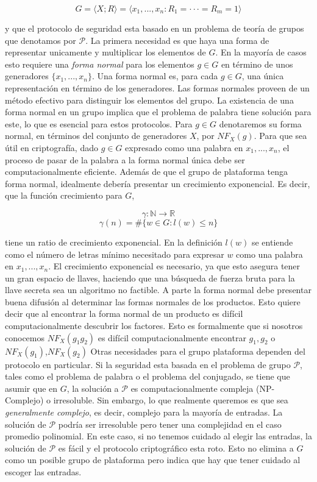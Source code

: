 \documentclass[12pt]{article}
\theoremstyle{definition}
\begin{document}
$$G = \langle X;R\rangle=\langle x_1,...,x_n: R_1=\cdot\cdot\cdot=R_m=1\rangle$$

y que el protocolo de seguridad esta basado en un problema de teoría de grupos que denotamos por $\mathcal{P}$. La primera necesidad es que haya una forma de representar unicamente y multiplicar los elementos de $G$. En la mayoría de casos esto requiere una \textit{forma normal} para los elementos $g\in G$ en término de unos generadores $\{x_1,...,x_n\}$. Una forma normal es, para cada $g\in G$, una única representación en término de los generadores. Las formas normales proveen de un método efectivo para distinguir los elementos del grupo. La existencia de una forma normal en un grupo implica que el problema de palabra tiene solución para este, lo que es esencial para estos protocolos. Para $g\in G$ denotaremos su forma normal, en términos del conjunto de generadores $X$, por $NF_X(g)$. Para que sea útil en criptografía, dado $g\in G$ expresado como una palabra en $x_1,...,x_n$, el proceso de pasar de la palabra a la forma normal única debe ser computacionalmente eficiente.
\newline
\newline
Además de que el grupo de plataforma tenga forma normal, idealmente debería presentar un crecimiento exponencial. Es decir, que la función crecimiento para $G$,

$$\gamma:\mathbb{N}\rightarrow\mathbb{R}$$
$$\gamma(n)=\#\{w\in G:l(w)\leq n\}$$

tiene un ratio de crecimiento exponencial. En la definición $l(w)$ se entiende como el número de letras mínimo necesitado para expresar $w$ como una palabra en $x_1,...,x_n$. El crecimiento exponencial es necesario, ya que esto asegura tener un gran espacio de llaves, haciendo que una búsqueda de fuerza bruta para la llave secreta sea un algoritmo no factible.
\newline
\newline
A parte la forma normal debe presentar buena difusión al determinar las formas normales de los productos. Esto quiere decir que al encontrar la forma normal de un producto es difícil computacionalmente descubrir los factores. Esto es formalmente que si nosotros conocemos $NF_X(g_1g_2)$ es difícil computacionalmente encontrar $g_1,g_2$ o $NF_X(g_1)$,$NF_X(g_2)$
\newline
\newline
Otras necesidades para el grupo plataforma dependen del protocolo en particular. Si la seguridad esta basada en el problema de grupo $\mathcal{P}$, tales como el problema de palabra o el problema del conjugado, se tiene que asumir que en $G$, la solución a $\mathcal{P}$ es computacionalmente compleja (NP-Complejo) o irresoluble. Sin embargo, lo que realmente queremos es que sea \textit{generalmente complejo}, es decir, complejo para la mayoría de entradas. La solución de $\mathcal{P}$ podría ser irresoluble pero tener una complejidad en el caso promedio polinomial. En este caso, si no tenemos cuidado al elegir las entradas, la solución de $\mathcal{P}$ es fácil y el protocolo criptográfico esta roto. Esto no elimina a $G$ como un posible grupo de plataforma pero indica que hay que tener cuidado al escoger las entradas.
\end{document}
